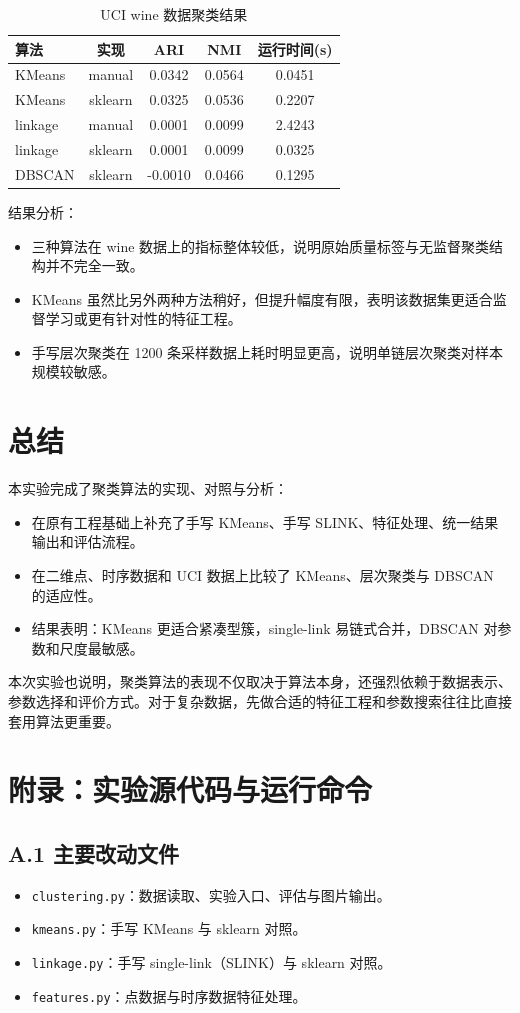 \documentclass[12pt,a4paper]{ctexart}
\begin{document}
\begin{table}[H]
\centering
\caption{UCI wine 数据聚类结果}
\label{tab:uci}
\begin{tabular}{lcccc}
\toprule
算法 & 实现 & ARI & NMI & 运行时间(s) \\
\midrule
KMeans & manual & 0.0342 & 0.0564 & 0.0451 \\
KMeans & sklearn & 0.0325 & 0.0536 & 0.2207 \\
linkage & manual & 0.0001 & 0.0099 & 2.4243 \\
linkage & sklearn & 0.0001 & 0.0099 & 0.0325 \\
DBSCAN & sklearn & -0.0010 & 0.0466 & 0.1295 \\
\bottomrule
\end{tabular}
\end{table}

结果分析：
\begin{itemize}
  \item 三种算法在 wine 数据上的指标整体较低，说明原始质量标签与无监督聚类结构并不完全一致。
  \item KMeans 虽然比另外两种方法稍好，但提升幅度有限，表明该数据集更适合监督学习或更有针对性的特征工程。
  \item 手写层次聚类在 1200 条采样数据上耗时明显更高，说明单链层次聚类对样本规模较敏感。
\end{itemize}

\section{总结}
本实验完成了聚类算法的实现、对照与分析：
\begin{itemize}
  \item 在原有工程基础上补充了手写 KMeans、手写 SLINK、特征处理、统一结果输出和评估流程。
  \item 在二维点、时序数据和 UCI 数据上比较了 KMeans、层次聚类与 DBSCAN 的适应性。
  \item 结果表明：KMeans 更适合紧凑型簇，single-link 易链式合并，DBSCAN 对参数和尺度最敏感。
\end{itemize}

本次实验也说明，聚类算法的表现不仅取决于算法本身，还强烈依赖于数据表示、参数选择和评价方式。对于复杂数据，先做合适的特征工程和参数搜索往往比直接套用算法更重要。

\section*{附录：实验源代码与运行命令}
\subsection*{A.1 主要改动文件}
\begin{itemize}
  \item \texttt{clustering.py}：数据读取、实验入口、评估与图片输出。
  \item \texttt{kmeans.py}：手写 KMeans 与 sklearn 对照。
  \item \texttt{linkage.py}：手写 single-link（SLINK）与 sklearn 对照。
  \item \texttt{features.py}：点数据与时序数据特征处理。
\end{itemize}
\end{document}
